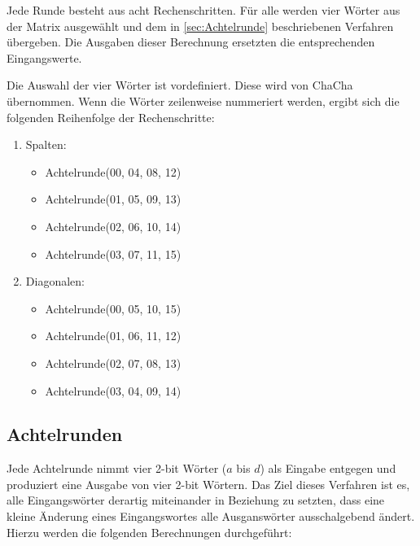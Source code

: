\documentclass[10pt,a4paper]{article}
\begin{document}
\medskip
Jede Runde besteht aus acht Rechenschritten.
Für alle werden vier Wörter aus der Matrix ausgewählt und dem in \autoref{sec:Achtelrunde} beschriebenen Verfahren übergeben.
Die Ausgaben dieser Berechnung ersetzten die entsprechenden Eingangswerte.

Die Auswahl der vier Wörter ist vordefiniert.
Diese wird von ChaCha übernommen\cite{Bernstein2008}.
Wenn die Wörter zeilenweise nummeriert werden, ergibt sich die folgenden Reihenfolge der Rechenschritte:
\begin{enumerate}
    \item Spalten:
          \begin{itemize}
              \item Achtelrunde(00, 04, 08, 12)
              \item Achtelrunde(01, 05, 09, 13)
              \item Achtelrunde(02, 06, 10, 14)
              \item Achtelrunde(03, 07, 11, 15)
          \end{itemize}
    \item Diagonalen:
          \begin{itemize}
              \item Achtelrunde(00, 05, 10, 15)
              \item Achtelrunde(01, 06, 11, 12)
              \item Achtelrunde(02, 07, 08, 13)
              \item Achtelrunde(03, 04, 09, 14)
          \end{itemize}
\end{enumerate}

\subsection{Achtelrunden}
\label{sec:Achtelrunde}

Jede Achtelrunde nimmt vier 2-bit Wörter ($a$ bis $d$) als Eingabe entgegen und produziert eine Ausgabe von vier 2-bit Wörtern.
Das Ziel dieses Verfahren ist es, alle Eingangswörter derartig miteinander in Beziehung zu setzten, dass eine kleine Änderung eines Eingangswortes alle Ausganswörter ausschalgebend ändert.
Hierzu werden die folgenden Berechnungen durchgeführt:
\end{document}
